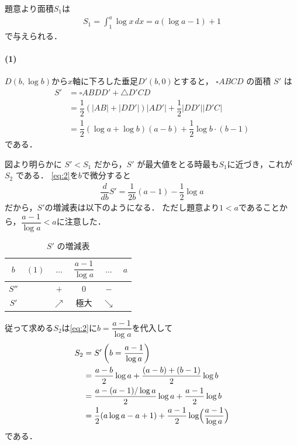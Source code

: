 \documentclass[../../main.tex]{subfiles}
\begin{document}
題意より面積$S_1$は
\begin{align}
  S_1 = \int_1^a \log x \, dx = a(\log a - 1) + 1 \label{eq:1}
\end{align}
で与えられる．

\paragraph{(1)}

$D(b,\log b)$から$x$軸に下ろした垂足$D'(b,0)$とすると，
$\square ABCD$ の面積 $S'$ は
\begin{align}
  S'
  &= \square ABD D' + \triangle D' C D \\
  &= \dfrac{1}{2}\left(|AB|+|DD'|\right)|AD'| + \dfrac{1}{2}|DD'||D'C| \\
  &= \dfrac{1}{2}(\log a + \log b)(a - b) + \dfrac{1}{2} \log b \cdot (b - 1) \label{eq:2}
\end{align}
である．

図より明らかに $S' < S_1$ だから，$S'$ が最大値をとる時最も$S_1$に近づき，これが $S_2$ である．
\cref{eq:2}を$b$で微分すると
\begin{align}
  \dfrac{d}{db} S' = \dfrac{1}{2b}(a - 1) - \dfrac{1}{2} \log a
\end{align}
だから，$S'$の増減表は以下のようになる．
ただし題意より$1<a$であることから，$\dfrac{a-1}{\log a} < a$に注意した．

\begin{table}[htb]
  \centering
  \caption{$S'$ の増減表}
  \begin{tabular}{c|ccccc}
    $b$ & $(1)$ & $\dots$ & $\dfrac{a-1}{\log a}$ & $\dots$ & $a$ \\ \hline
    $S''$ & & $+$ & $0$ & $-$ & \\ \hline
    $S'$ & & $\nearrow$ & 極大 & $\searrow$ &
  \end{tabular}
\end{table}

従って求める$S_2$は\cref{eq:2}に$b = \dfrac{a-1}{\log a}$を代入して
\begin{align}
  S_2
  &= S'\left(b = \dfrac{a-1}{\log a}\right) \\
  &= \dfrac{a-b}{2}\log a + \dfrac{(a-b)+(b-1)}{2}\log b \\
  &= \dfrac{a-(a-1)/\log a}{2}\log a + \dfrac{a-1}{2}\log b \\
  &= \dfrac{1}{2}(a \log a - a + 1) + \dfrac{a-1}{2} \log\Bigl(\dfrac{a-1}{\log a}\Bigr) \label{eq:3}
\end{align}
である．
\end{document}
